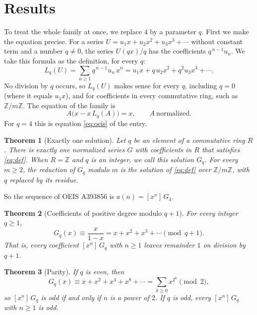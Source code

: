 \documentclass[11pt,a4paper]{article}
\newtheorem{theorem}{Theorem}[section]
\theoremstyle{definition}
\theoremstyle{remark}
\newcommand{\Z}{\mathbb{Z}}
\newcommand{\coeff}[2]{[x^{#1}]\,#2}
\begin{document}
\section{Results}\label{sec:results}

To treat the whole family at once, we replace $4$ by a parameter $q$. First we make the equation
precise. For a series $U=u_1x+u_2x^2+u_3x^3+\cdots$ without constant term and a number $q\ne0$, the series $U(qx)/q$
has the coefficients $q^{\,n-1}u_n$. We take this formula as the definition, for every $q$:
\begin{equation}\label{eq:L}
L_q(U)=\sum_{n\ge1}q^{\,n-1}u_n\,x^n=u_1x+q\,u_2x^2+q^2u_3x^3+\cdots .
\end{equation}
No division by $q$ occurs, so $L_q(U)$ makes sense for every $q$, including $q=0$ (where it equals $u_1x$), and for
coefficients in every commutative ring, such as $\Z/m\Z$. The equation of the family is
\begin{equation}\label{eq:def}
A\bigl(x-x\,L_q(A)\bigr)=x,\qquad A\ \text{normalized}.
\end{equation}
For $q=4$ this is equation \eqref{eq:oeis} of the entry.

\begin{theorem}[Exactly one solution]\label{thm:exist}
Let $q$ be an element of a commutative ring $R$. There is exactly one normalized series $G$ with coefficients in $R$
that satisfies \eqref{eq:def}. When $R=\Z$ and $q$ is an integer, we call this solution $G_q$. For every $m\ge2$, the
reduction of $G_q$ modulo $m$ is the solution of \eqref{eq:def} over $\Z/m\Z$, with $q$ replaced by its residue.
\end{theorem}

So the sequence of OEIS A393856 is $a(n)=\coeff{n}{G_{4}}$.

\begin{theorem}[Coefficients of positive degree modulo $q+1$]\label{thm:mod}
For every integer $q\ge1$,
\[
G_q(x)\equiv\frac{x}{1-x}=x+x^2+x^3+\cdots\pmod{q+1}.
\]
That is, every coefficient $\coeff{n}{G_q}$ with $n\ge1$ leaves remainder $1$ on division by $q+1$.
\end{theorem}

\begin{theorem}[Parity]\label{thm:parity}
If $q$ is even, then
\[
G_q(x)\equiv x+x^2+x^4+x^8+\cdots=\sum_{k\ge0}x^{2^k}\pmod 2,
\]
so $\coeff{n}{G_q}$ is odd if and only if $n$ is a power of $2$. If $q$ is odd, every $\coeff{n}{G_q}$ with $n\ge1$
is odd.
\end{theorem}
\end{document}
